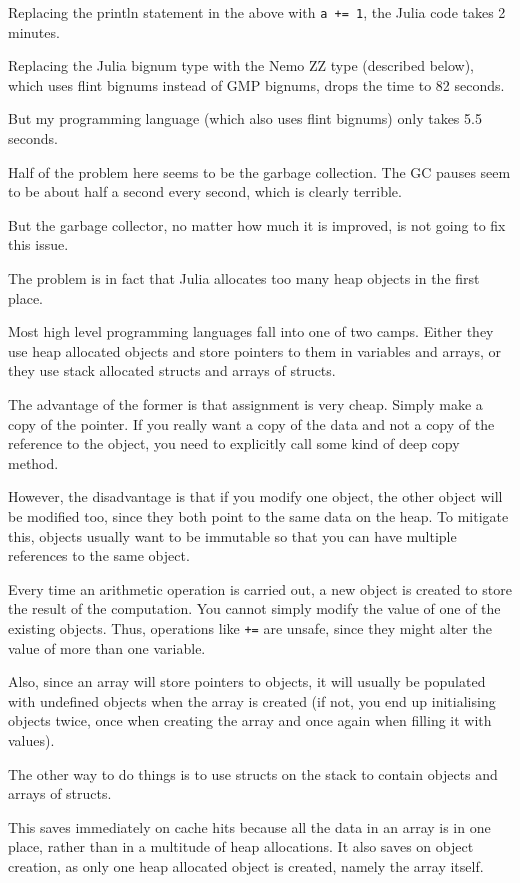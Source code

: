 \documentclass[a4paper,10pt]{article}
\newcommand{\code}{\lstinline}
\begin{document}
Replacing the println statement in the above with \code{a += 1}, the Julia code takes 2 minutes.

Replacing the Julia bignum type with the Nemo ZZ type (described below), which uses flint bignums
instead of GMP bignums, drops the time to 82 seconds.

But my programming language (which also uses flint bignums) only takes 5.5 seconds.

Half of the problem here seems to be the garbage collection. The GC pauses seem to be about half
a second every second, which is clearly terrible.

But the garbage collector, no matter how much it is improved, is not going to fix this issue.

The problem is in fact that Julia allocates too many heap objects in the first place.

Most high level programming languages fall into one of two camps. Either they use heap allocated
objects and store pointers to them in variables and arrays, or they use stack allocated structs
and arrays of structs.

The advantage of the former is that assignment is very cheap. Simply make a copy of the pointer.
If you really want a copy of the data and not a copy of the reference to the object, you need
to explicitly call some kind of deep copy method.

However, the disadvantage is that if you modify one object, the other object will be modified too,
since they both point to the same data on the heap. To mitigate this, objects usually want to be
immutable so that you can have multiple references to the same object.

Every time an arithmetic operation is carried out, a new object is created to store the result
of the computation. You cannot simply modify the value of one of the existing objects. Thus,
operations like \code{+=} are unsafe, since they might alter the value of more than one variable.

Also, since an array will store pointers to objects, it will usually be populated with undefined
objects when the array is created (if not, you end up initialising objects twice, once when
creating the array and once again when filling it with values).

The other way to do things is to use structs on the stack to contain objects and arrays of structs.

This saves immediately on cache hits because all the data in an array is in one place, rather than
in a multitude of heap allocations. It also saves on object creation, as only one heap allocated
object is created, namely the array itself.
\end{document}
